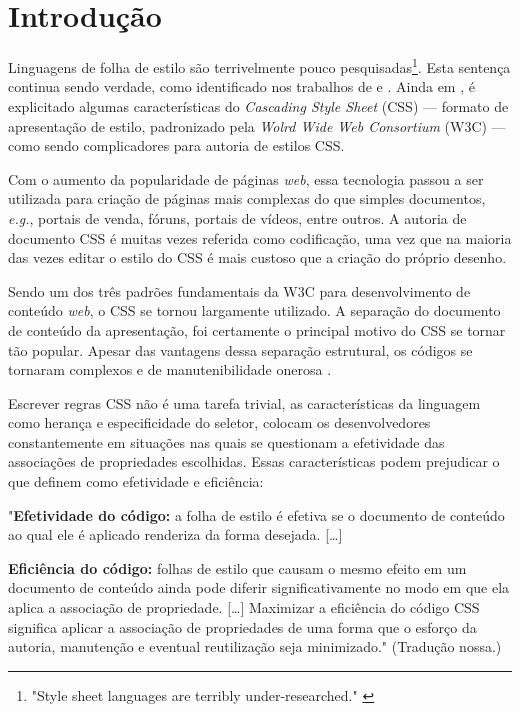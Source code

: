 %
%

\chapter{Introdução}\label{chap:introducao}
\label{chap:intro}

Linguagens de folha de estilo são terrivelmente pouco pesquisadas\footnote{"Style sheet languages are terribly under-researched." \cite[tradução nossa]{Marden1999}}. Esta sentença continua sendo verdade, como identificado nos trabalhos de  e . Ainda em , é explicitado algumas características do \textit{Cascading Style Sheet} (CSS) --- formato de apresentação de estilo, padronizado pela \textit{Wolrd Wide Web Consortium} (W3C) --- como sendo complicadores para autoria de estilos CSS.

Com o aumento da popularidade de páginas \textit{web}, essa tecnologia passou a ser utilizada para criação de páginas mais complexas do que simples documentos, \textit{e.g.}, portais de venda, fóruns, portais de vídeos, entre outros. A autoria de documento CSS é muitas vezes referida como codificação, uma vez que na maioria das vezes editar o estilo do CSS é mais custoso que a criação do próprio desenho.

Sendo um dos três padrões fundamentais da W3C para desenvolvimento de conteúdo \textit{web}, o CSS se tornou largamente utilizado. A separação do documento de conteúdo da apresentação, foi certamente o principal motivo do CSS se tornar tão popular. Apesar das vantagens dessa separação estrutural, os códigos se tornaram complexos e de manutenibilidade onerosa \cite{Mesbah2012}.

Escrever regras CSS não é uma tarefa trivial, as características da linguagem como herança e especificidade do seletor, colocam os desenvolvedores constantemente em situações nas quais se questionam a efetividade das associações de propriedades escolhidas. Essas características podem prejudicar o que  definem como efetividade e eficiência:

\begin{citacao}
	"\textbf{Efetividade do código:} a folha de estilo é efetiva se o documento de conteúdo ao qual ele é aplicado renderiza da forma desejada. [\ldots]
	
	\textbf{Eficiência do código:} folhas de estilo que causam o mesmo efeito em um documento de conteúdo ainda pode diferir significativamente no modo em que ela aplica a associação de propriedade. [\ldots] Maximizar a eficiência do código CSS significa aplicar a associação de propriedades de uma forma que o esforço da autoria, manutenção e eventual reutilização seja minimizado." (Tradução nossa.)
\end{citacao}

